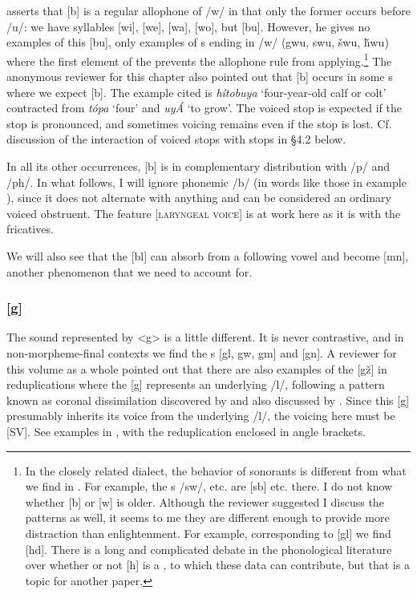 \documentclass[output=paper]{LSP/langsci}
\begin{document}
\citet[8]{Rankin2001} asserts that [b] is a regular allophone of /w/ in that only the former occurs before /u/: we have syllables [wi], [we], [wa], [wo], but [bu]. However, he gives no examples of this [bu], only examples of s ending in /w/ (gwu, swu, \v{s}wu, \v{h}wu) where the first element of the  prevents the allophone rule from applying.\footnote{In the closely related  dialect, the behavior of sonorants is different from what we find in . For example, the s /sw/, etc. are [sb] etc. there. I do not know whether [b] or [w] is older. Although the reviewer suggested I discuss the  patterns as well, it seems to me they are different enough to provide more distraction than enlightenment. For example, corresponding to  [gl] we find  [hd]. There is a long and complicated debate in the phonological literature over whether or not [h] is a , to which these  data can contribute, but that is a topic for another paper.} The anonymous reviewer for this chapter also pointed out that [b] occurs in some s where we expect [b]. The example cited is \textit{h\'itobuya} `four-year-old calf or colt' contracted from \textit{t\'opa} `four' and \textit{uy\'A} `to grow'. The voiced stop is expected if the  stop is pronounced, and sometimes voicing remains even if the  stop is lost. Cf. discussion of the interaction of voiced stops with  stops in \S 4.2 below.

In all its other occurrences, [b] is in complementary distribution with /p/ and /ph/. In what follows, I will ignore phonemic /b/ (in words like those in example ), since it does not alternate with anything and can be considered an ordinary voiced obstruent. The feature [\textsc{laryngeal voice}] is at work here as it is with the fricatives.

We will also see that the [bl]  can absorb  from a following vowel and become [mn], another phenomenon that we need to account for.

\subsubsection{[g]} 
The sound represented by <g> is a little different. It is never contrastive, and in non-morpheme-final contexts we find the s [gl, gw, gm] and [gn]. A reviewer for this volume as a whole pointed out that there are also examples of the  [g\v{z}] in reduplications where the [g] represents an underlying /l/, following a pattern known as coronal dissimilation discovered by \citet[225--226]{Carter1974} and also discussed by \citet[338]{Shaw1980}.  Since this [g] presumably inherits its voice from the underlying /l/, the voicing here must be [\textsc{SV}].  See examples in , with the reduplication enclosed in angle brackets.
 
\end{document}
